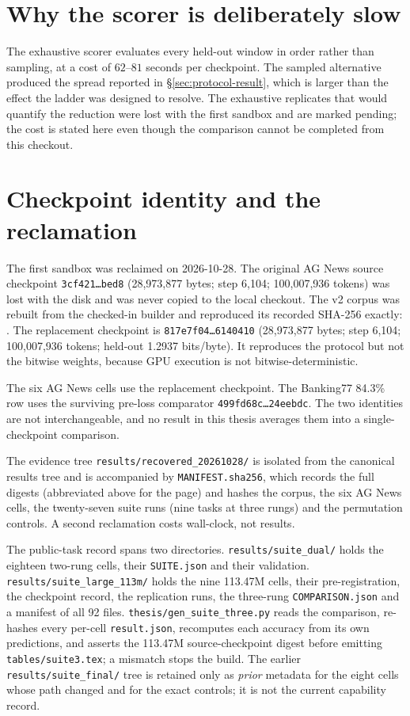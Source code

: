 \section{Why the scorer is deliberately slow}

The exhaustive scorer evaluates every held-out window in order rather than
sampling, at a cost of $62$--$81$ seconds per checkpoint. The sampled alternative
produced the \ProtoOldSpread{} spread reported in \S\ref{sec:protocol-result},
which is larger than the effect the ladder was designed to resolve. The exhaustive
replicates that would quantify the reduction were lost with the first sandbox and
are marked pending; the cost is stated here even though the comparison cannot be
completed from this checkout.

\section{Checkpoint identity and the reclamation}

The first sandbox was reclaimed on 2026-10-28. The original AG News source
checkpoint \texttt{3cf421\ldots bed8} (28,973,877 bytes; step 6,104;
100,007,936 tokens) was lost with the disk and was never copied to the local
checkout. The v2 corpus was rebuilt from the checked-in builder and reproduced its
recorded SHA-256 exactly: \CorpusSha. The replacement checkpoint is
\texttt{817e7f04\ldots6140410}
(28,973,877 bytes; step 6,104; 100,007,936 tokens; held-out 1.2937 bits/byte).
It reproduces the protocol but not the bitwise weights, because GPU execution is
not bitwise-deterministic.

The six AG News cells use the replacement checkpoint. The Banking77 84.3\% row
uses the surviving pre-loss comparator
\texttt{499fd68c\ldots24eebdc}.
The two identities are not interchangeable, and no result in this thesis averages
them into a single-checkpoint comparison.

The evidence tree \texttt{results/recovered\_20261028/} is isolated from the
canonical results tree and is accompanied by \texttt{MANIFEST.sha256}, which records
the full digests (abbreviated above for the page) and hashes the corpus, the six
AG News cells, the twenty-seven suite runs (nine tasks at three rungs) and the
permutation controls. A second reclamation costs wall-clock, not results.

The public-task record spans two directories. \texttt{results/suite\_dual/}
holds the eighteen two-rung cells, their \texttt{SUITE.json} and their
validation. \texttt{results/}\allowbreak\texttt{suite\_large\_113m/} holds the
nine 113.47M cells,
their pre-registration, the checkpoint record, the replication runs, the
three-rung \texttt{COMPARISON.json} and a manifest of all 92 files.
\texttt{thesis/gen\_suite\_three.py} reads the comparison, re-hashes every
per-cell \texttt{result.json}, recomputes each accuracy from its own predictions,
and asserts the 113.47M source-checkpoint digest before emitting
\texttt{tables/suite3.tex}; a mismatch stops the build. The
earlier \texttt{results/suite\_final/} tree is retained only as \emph{prior}
metadata for the eight cells whose path changed and for the exact controls; it is
not the current capability record.

